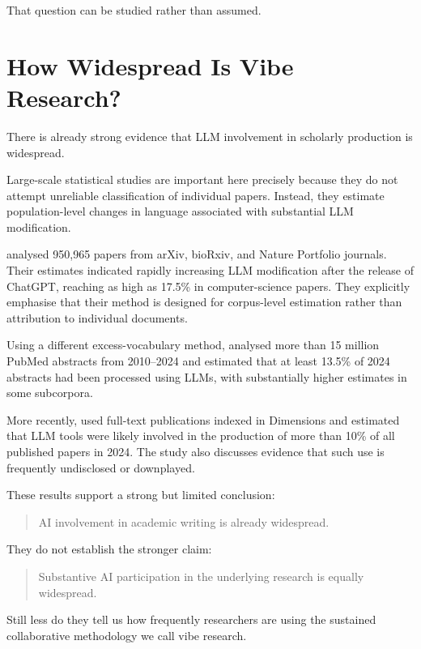 That question can be studied rather than assumed.


\section{How Widespread Is Vibe Research?}

There is already strong evidence that LLM involvement in scholarly production is widespread.

Large-scale statistical studies are important here precisely because they do not attempt unreliable classification of individual papers. Instead, they estimate population-level changes in language associated with substantial LLM modification.

\citet{liangEtAl2024mapping} analysed 950,965 papers from arXiv, bioRxiv, and Nature Portfolio journals. Their estimates indicated rapidly increasing LLM modification after the release of ChatGPT, reaching as high as 17.5\% in computer-science papers. They explicitly emphasise that their method is designed for corpus-level estimation rather than attribution to individual documents.

Using a different excess-vocabulary method, \citet{kobakEtAl2024biomedical} analysed more than 15 million PubMed abstracts from 2010--2024 and estimated that at least 13.5\% of 2024 abstracts had been processed using LLMs, with substantially higher estimates in some subcorpora.

More recently, \citet{gray2025prevalence} used full-text publications indexed in Dimensions and estimated that LLM tools were likely involved in the production of more than 10\% of all published papers in 2024. The study also discusses evidence that such use is frequently undisclosed or downplayed.

These results support a strong but limited conclusion:

\begin{quote}
AI involvement in academic writing is already widespread.
\end{quote}

They do not establish the stronger claim:

\begin{quote}
Substantive AI participation in the underlying research is equally widespread.
\end{quote}

Still less do they tell us how frequently researchers are using the sustained collaborative methodology we call vibe research.

